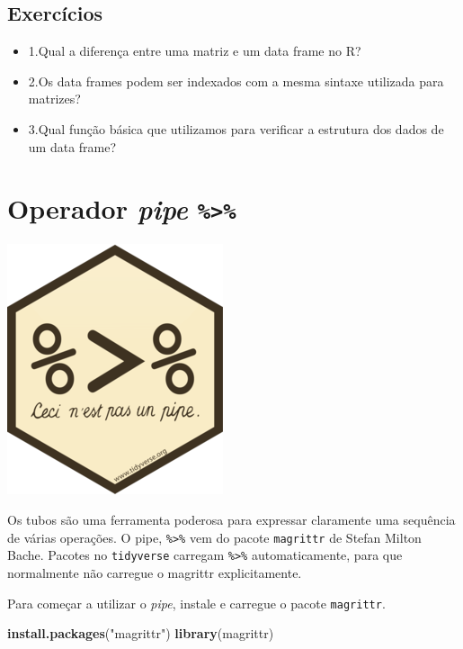 \documentclass[]{book}
\newenvironment{Shaded}{\begin{snugshade}}{\end{snugshade}}
\newcommand{\KeywordTok}[1]{\textcolor[rgb]{0.13,0.29,0.53}{\textbf{#1}}}
\newcommand{\NormalTok}[1]{#1}
\newcommand{\StringTok}[1]{\textcolor[rgb]{0.31,0.60,0.02}{#1}}
\providecommand{\tightlist}{%
  \setlength{\itemsep}{0pt}\setlength{\parskip}{0pt}}
\begin{document}
\hypertarget{exercuxedcios-3}{%
\subsection{Exercícios}\label{exercuxedcios-3}}

\begin{itemize}
\tightlist
\item
  1.Qual a diferença entre uma matriz e um data frame no R?
\item
  2.Os data frames podem ser indexados com a mesma sintaxe utilizada para matrizes?
\item
  3.Qual função básica que utilizamos para verificar a estrutura dos dados de um data frame?
\end{itemize}

\hypertarget{operador-pipe}{%
\section{\texorpdfstring{Operador \emph{pipe} \texttt{\%\textgreater{}\%}}{Operador pipe \%\textgreater\%}}\label{operador-pipe}}

\begin{center}\includegraphics[width=0.25\linewidth]{imagens/magritt} \end{center}

Os tubos são uma ferramenta poderosa para expressar claramente uma sequência de várias operações. O pipe, \texttt{\%\textgreater{}\%} vem do pacote \texttt{magrittr} de Stefan Milton Bache. Pacotes no \texttt{tidyverse} carregam \texttt{\%\textgreater{}\%} automaticamente, para que normalmente não carregue o magrittr explicitamente.

Para começar a utilizar o \emph{pipe}, instale e carregue o pacote \texttt{magrittr}.

\begin{Shaded}
\begin{Highlighting}[]
\KeywordTok{install.packages}\NormalTok{(}\StringTok{"magrittr"}\NormalTok{)}
\KeywordTok{library}\NormalTok{(magrittr)}
\end{Highlighting}
\end{Shaded}
\end{document}
